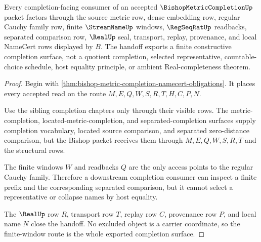 \begin{theorem}
\label{thm:bishop-metric-completion-finite-window-handoff}
Every completion-facing consumer of an accepted $\BishopMetricCompletionUp$ packet factors through the source metric row, dense embedding row, regular Cauchy family row, finite $\StreamNameUp$ windows, $\RegSeqRatUp$ readbacks, separated comparison row, $\RealUp$ seal, transport, replay, provenance, and local NameCert rows displayed by $B$. The handoff exports a finite constructive completion surface, not a quotient completion, selected representative, countable-choice schedule, host equality principle, or ambient Real-completeness theorem.
\end{theorem}
\begin{proof}
Begin with \autoref{thm:bishop-metric-completion-namecert-obligations}. It places every accepted read on the route $M,E,Q,W,S,R,T,H,C,P,N$.

Use the sibling completion chapters only through their visible rows. The metric-completion, located-metric-completion, and separated-completion surfaces supply completion vocabulary, located source comparison, and separated zero-distance comparison, but the Bishop packet receives them through $M,E,Q,W,S,R,T$ and the structural rows.

The finite windows $W$ and readbacks $Q$ are the only access points to the regular Cauchy family. Therefore a downstream completion consumer can inspect a finite prefix and the corresponding separated comparison, but it cannot select a representative or collapse names by host equality.

The $\RealUp$ row $R$, transport row $T$, replay row $C$, provenance row $P$, and local name $N$ close the handoff. No excluded object is a carrier coordinate, so the finite-window route is the whole exported completion surface.
\end{proof}

